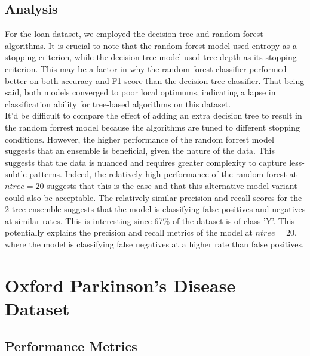 \documentclass{article}
\begin{document}
\subsection*{Analysis}
For the loan dataset, we employed the decision tree and random forest algorithms.
It is crucial to note that the random forest model used entropy as a stopping criterion,
while the decision tree model used tree depth as its stopping criterion.
This may be a factor in why the random forest classifier performed better on both accuracy and F1-score
than the decision tree classifier.
That being said, both models converged to poor local optimums, 
indicating a lapse in classification ability for tree-based algorithms on this dataset.
\\

It'd be difficult to compare the effect of adding an extra decision tree to result in the random forrest model because the algorithms are tuned to different stopping conditions.
However, the higher performance of the random forrest model suggests that an ensemble is beneficial, given the nature of the data. This suggests that the data is nuanced and requires greater complexity to capture 
less-subtle patterns. Indeed, the relatively high performance of the random forest at $ntree=20$ suggests that this is the case and that this alternative model variant could also be acceptable.
The relatively similar precision and recall scores for the 2-tree ensemble suggests that the model is classifying false positives and negatives at similar rates. This is interesting since 67\% of the dataset is of class 'Y'.
This potentially explains the precision and recall metrics of the model at $ntree=20$, where the model is classifying false negatives at a higher rate than false positives.


\newpage
\section*{Oxford Parkinson's Disease Dataset}


\subsection*{Performance Metrics}
\end{document}
